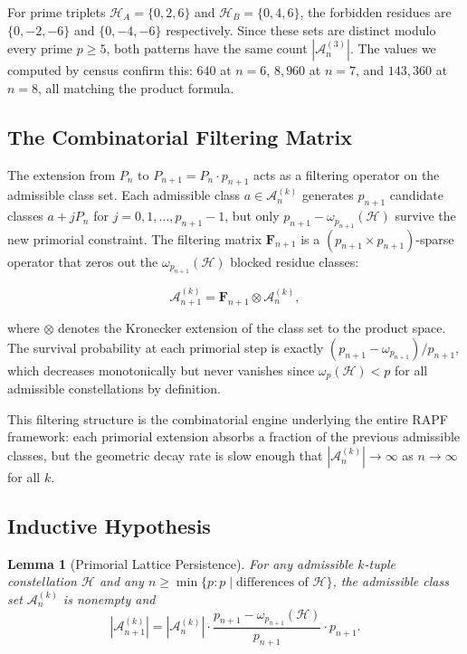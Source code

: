 \documentclass[11pt]{article}
\newtheorem{lemma}[theorem]{Lemma}
\theoremstyle{remark}
\begin{document}
For prime triplets $\mathcal{H}_A = \{0, 2, 6\}$ and
$\mathcal{H}_B = \{0, 4, 6\}$, the forbidden residues are
$\{0, -2, -6\}$ and $\{0, -4, -6\}$ respectively. Since these sets
are distinct modulo every prime $p \geq 5$, both patterns have the
same count $\left|\mathcal{A}_n^{(3)}\right|$. The values we computed
by census confirm this: $640$ at $n=6$, $8{,}960$ at $n=7$, and
$143{,}360$ at $n=8$, all matching the product formula.

\subsection{The Combinatorial Filtering Matrix}

The extension from $P_n$ to $P_{n+1} = P_n \cdot p_{n+1}$ acts as a
filtering operator on the admissible class set. Each admissible class
$a \in \mathcal{A}_n^{(k)}$ generates $p_{n+1}$ candidate classes
$a + j P_n$ for $j = 0, 1, \ldots, p_{n+1} - 1$, but only
$p_{n+1} - \omega_{p_{n+1}}(\mathcal{H})$ survive the new primorial
constraint. The filtering matrix $\mathbf{F}_{n+1}$ is a
$(p_{n+1} \times p_{n+1})$-sparse operator that zeros out the
$\omega_{p_{n+1}}(\mathcal{H})$ blocked residue classes:

\begin{equation}
\mathcal{A}_{n+1}^{(k)} = \mathbf{F}_{n+1} \otimes
\mathcal{A}_n^{(k)},
\label{eq:filtering}
\end{equation}

where $\otimes$ denotes the Kronecker extension of the class set to the
product space. The survival probability at each primorial step is
exactly $(p_{n+1} - \omega_{p_{n+1}}) / p_{n+1}$, which decreases
monotonically but never vanishes since $\omega_p(\mathcal{H}) < p$ for
all admissible constellations by definition.

This filtering structure is the combinatorial engine underlying the
entire RAPF framework: each primorial extension absorbs a fraction of
the previous admissible classes, but the geometric decay rate is
slow enough that $\left|\mathcal{A}_n^{(k)}\right| \to \infty$ as
$n \to \infty$ for all $k$.

\subsection{Inductive Hypothesis}

\begin{lemma}[Primorial Lattice Persistence]
\label{lem:lattice-persistence}
For any admissible $k$-tuple constellation $\mathcal{H}$ and any
$n \geq \min\{p : p \mid \text{differences of }\mathcal{H}\}$, the
admissible class set $\mathcal{A}_n^{(k)}$ is nonempty and
\begin{equation}
\left|\mathcal{A}_{n+1}^{(k)}\right| =
\left|\mathcal{A}_n^{(k)}\right| \cdot
\frac{p_{n+1} - \omega_{p_{n+1}}(\mathcal{H})}{p_{n+1}} \cdot p_{n+1}.
\end{equation}
\end{lemma}
\end{document}
